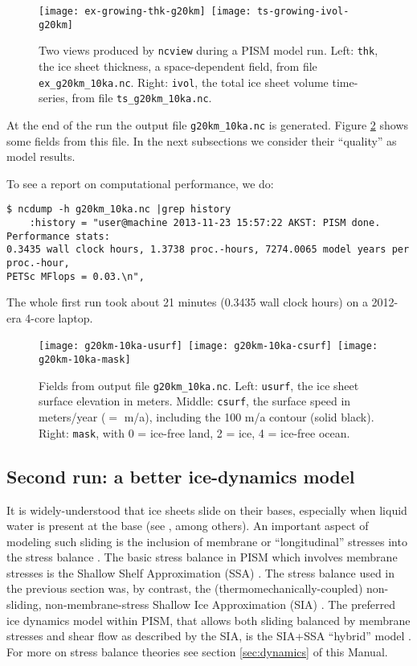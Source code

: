 \begin{figure}[ht]
\centering
\mbox{\texttt{[image: ex-growing-thk-g20km]}
  \qquad \texttt{[image: ts-growing-ivol-g20km]}}
\caption{Two views produced by \texttt{ncview} during a PISM model run.  Left: \texttt{thk}, the ice sheet thickness, a space-dependent field, from file \texttt{ex_g20km_10ka.nc}.  Right: \texttt{ivol}, the total ice sheet volume time-series, from file \texttt{ts_g20km_10ka.nc}.}
\label{fig:growing}
\end{figure}

At the end of the run the output file \texttt{g20km_10ka.nc} is generated.  Figure \ref{fig:firstoutput} shows some fields from this file.  In the next subsections we consider their ``quality'' as model results.

To see a report on computational performance, we do:
\begin{verbatim}
$ ncdump -h g20km_10ka.nc |grep history
    :history = "user@machine 2013-11-23 15:57:22 AKST: PISM done.  Performance stats:
0.3435 wall clock hours, 1.3738 proc.-hours, 7274.0065 model years per proc.-hour,
PETSc MFlops = 0.03.\n",
\end{verbatim}
The whole first run took about 21 minutes (0.3435 wall clock hours) on a 2012-era 4-core laptop.

\begin{figure}[ht]
\centering
\mbox{\texttt{[image: g20km-10ka-usurf]} \texttt{[image: g20km-10ka-csurf]} \texttt{[image: g20km-10ka-mask]}}
\caption{Fields from output file \texttt{g20km_10ka.nc}.  Left: \texttt{usurf}, the ice sheet surface elevation in meters.  Middle: \texttt{csurf}, the surface speed in meters/year ($=$ m/a), including the 100 m/a contour (solid black).  Right: \texttt{mask}, with 0 = ice-free land, 2 = ice, 4 = ice-free ocean.}
\label{fig:firstoutput}
\end{figure}


\subsection{Second run: a better ice-dynamics model}  \label{subsect:ssarun}

It is widely-understood that ice sheets slide on their bases, especially when liquid water is present at the base (see \cite{Joughinetal2001,MacAyeal}, among others).  An important aspect of modeling such sliding is the inclusion of membrane or ``longitudinal'' stresses into the stress balance \cite{BBssasliding}.  The basic stress balance in PISM which involves membrane stresses is the Shallow Shelf Approximation (SSA) \cite{WeisGreveHutter}.  The stress balance used in the previous section was, by contrast, the (thermomechanically-coupled) non-sliding, non-membrane-stress Shallow Ice Approximation (SIA) \cite{BBL,EISMINT00}.  The preferred ice dynamics model within PISM, that allows both sliding balanced by membrane stresses and shear flow as described by the SIA, is the SIA+SSA ``hybrid'' model \cite{BBssasliding,Winkelmannetal2011}.  For more on stress balance theories see section \ref{sec:dynamics} of this Manual.

